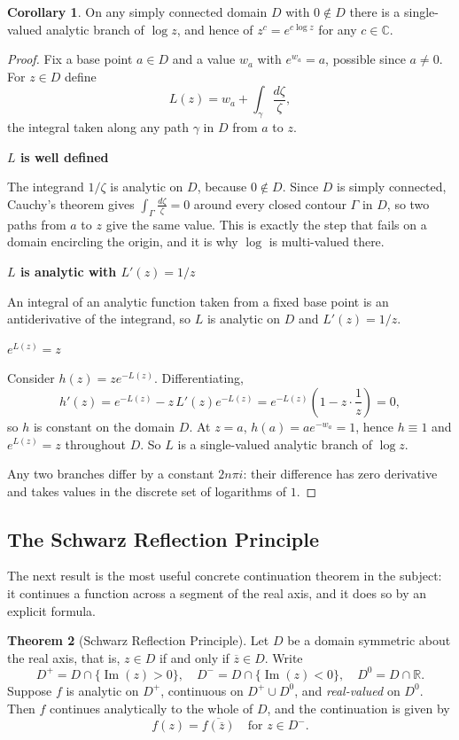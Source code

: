 \documentclass[11pt,a4paper]{article}
\theoremstyle{definition}
\newtheorem{thm}{Theorem}[section]
\newtheorem{corollary}[thm]{Corollary}
\newcommand{\subhead}[1]{%
  \par\medskip\noindent\textbf{#1}\par\nobreak\smallskip}
\begin{document}
\begin{corollary}
On any simply connected domain $D$ with $0 \notin D$ there is a single-valued
analytic branch of $\log z$, and hence of $z^{c} = e^{c \log z}$ for any
$c \in \mathbb{C}$.
\end{corollary}

\begin{proof}
Fix a base point $a\in D$ and a value $w_a$ with $e^{w_a}=a$, possible since
$a\neq 0$. For $z\in D$ define
$$L(z)=w_a+\int_{\gamma}\frac{d\zeta}{\zeta},$$
the integral taken along any path $\gamma$ in $D$ from $a$ to $z$.

\subhead{$L$ is well defined}
The integrand $1/\zeta$ is analytic on $D$, because $0\notin D$. Since $D$ is
simply connected, Cauchy's theorem gives $\int_{\Gamma}\frac{d\zeta}{\zeta}=0$
around every closed contour $\Gamma$ in $D$, so two paths from $a$ to $z$ give
the same value. This is exactly the step that fails on a domain encircling the
origin, and it is why $\log$ is multi-valued there.

\subhead{$L$ is analytic with $L'(z)=1/z$}
An integral of an analytic function taken from a fixed base point is an
antiderivative of the integrand, so $L$ is analytic on $D$ and $L'(z)=1/z$.

\subhead{$e^{L(z)}=z$}
Consider $h(z)=ze^{-L(z)}$. Differentiating,
$$h'(z)=e^{-L(z)}-z\,L'(z)e^{-L(z)}=e^{-L(z)}\left(1-z\cdot\frac1z\right)=0 ,$$
so $h$ is constant on the domain $D$. At $z=a$, $h(a)=ae^{-w_a}=1$, hence
$h\equiv 1$ and $e^{L(z)}=z$ throughout $D$. So $L$ is a single-valued analytic
branch of $\log z$.

Any two branches differ by a constant $2n\pi i$: their difference has zero
derivative and takes values in the discrete set of logarithms of $1$.
\end{proof}

{\color[wave]{485}\subsection{The Schwarz Reflection Principle}}

The next result is the most useful concrete continuation theorem in the subject:
it continues a function across a segment of the real axis, and it does so by an
explicit formula.

\begin{thm}[Schwarz Reflection Principle]
Let $D$ be a domain symmetric about the real axis, that is, $z \in D$ if and only
if $\overline{z} \in D$. Write
$$D^{+} = D \cap \{\operatorname{Im}(z) > 0\},\quad 
D^{-} = D \cap \{\operatorname{Im}(z) < 0\},\quad 
D^{0} = D \cap \mathbb{R}.$$
Suppose $f$ is analytic on $D^{+}$, continuous on $D^{+} \cup D^{0}$, and
\emph{real-valued} on $D^{0}$. Then $f$ continues analytically to the whole of
$D$, and the continuation is given by
$$f(z) = \overline{f(\overline{z})}\quad \text{for } z \in D^{-}.$$
\end{thm}
\end{document}
